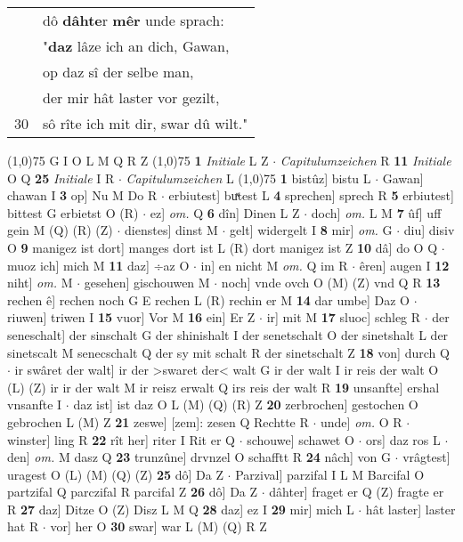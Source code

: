 \documentclass[8pt,a4paper,notitlepage]{article}
\begin{document}
\begin{table}[ht]
\begin{minipage}[t]{0.5\linewidth}
\begin{tabular}{rl}
 & dô \textbf{dâhte}r \textbf{mêr} unde sprach:\\ 
 & "\textbf{daz} lâze ich an dich, Gawan,\\ 
 & op daz sî der selbe man,\\ 
 & der mir hât laster vor gezilt,\\ 
30 & sô rîte ich mit dir, swar dû wilt."\\ 
\end{tabular}
\scriptsize
\line(1,0){75} \newline
G I O L M Q R Z \newline
\line(1,0){75} \newline
\textbf{1} \textit{Initiale} L Z   $\cdot$ \textit{Capitulumzeichen} R  \textbf{11} \textit{Initiale} O Q  \textbf{25} \textit{Initiale} I R   $\cdot$ \textit{Capitulumzeichen} L  \newline
\line(1,0){75} \newline
\textbf{1} bistûz] bistu L  $\cdot$ Gawan] chawan I \textbf{3} op] Nu M Do R  $\cdot$ erbiutest] buͯtest L \textbf{4} sprechen] sprech R \textbf{5} erbiutest] bittest G erbietst O (R)  $\cdot$ ez] \textit{om.} Q \textbf{6} dîn] Dinen L Z  $\cdot$ doch] \textit{om.} L M \textbf{7} ûf] uff gein M (Q) (R) (Z)  $\cdot$ dienstes] dinst M  $\cdot$ gelt] widergelt I \textbf{8} mir] \textit{om.} G  $\cdot$ diu] disiv O \textbf{9} manigez ist dort] manges dort ist L (R) dort manigez ist Z \textbf{10} dâ] do O Q  $\cdot$ muoz ich] mich M \textbf{11} daz] ÷az O  $\cdot$ in] en nicht M \textit{om.} Q im R  $\cdot$ êren] augen I \textbf{12} niht] \textit{om.} M  $\cdot$ gesehen] gischouwen M  $\cdot$ noch] vnde ovch O (M) (Z) vnd Q R \textbf{13} rechen ê] rechen noch G E rechen L (R) rechin er M \textbf{14} dar umbe] Daz O  $\cdot$ riuwen] triwen I \textbf{15} vuor] Vor M \textbf{16} ein] Er Z  $\cdot$ ir] mit M \textbf{17} sluoc] schleg R  $\cdot$ der seneschalt] der sinschalt G der shinishalt I der senetschalt O der sinetshalt L der sinetscalt M senecschalt Q der sy mit schalt R der sinetschalt Z \textbf{18} von] durch Q  $\cdot$ ir swâret der walt] ir der >swaret der< walt G ir der walt I ir reis der walt O (L) (Z) ir ir der walt M ir reisz erwalt Q irs reis der walt R \textbf{19} unsanfte] ershal vnsanfte I  $\cdot$ daz ist] ist daz O L (M) (Q) (R) Z \textbf{20} zerbrochen] gestochen O gebrochen L (M) Z \textbf{21} zeswe] [zem]: zesen Q Rechtte R  $\cdot$ unde] \textit{om.} O R  $\cdot$ winster] ling R \textbf{22} rît her] riter I Rit er Q  $\cdot$ schouwe] schawet O  $\cdot$ ors] daz ros L  $\cdot$ den] \textit{om.} M dasz Q \textbf{23} trunzûne] drvnzel O schafftt R \textbf{24} nâch] von G  $\cdot$ vrâgtest] uragest O (L) (M) (Q) (Z) \textbf{25} dô] Da Z  $\cdot$ Parzival] parzifal I L M Barcifal O partzifal Q parczifal R parcifal Z \textbf{26} dô] Da Z  $\cdot$ dâhter] fraget er Q (Z) fragte er R \textbf{27} daz] Ditze O (Z) Disz L M Q \textbf{28} daz] ez I \textbf{29} mir] mich L  $\cdot$ hât laster] laster hat R  $\cdot$ vor] her O \textbf{30} swar] war L (M) (Q) R Z \newline

\end{minipage}
\end{table}
\end{document}
